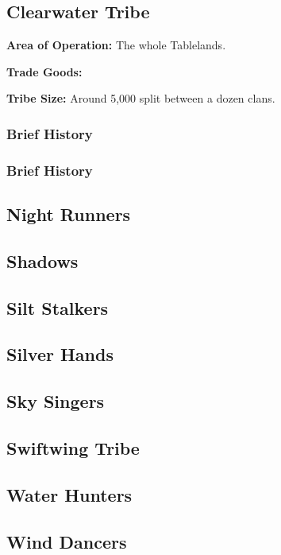 \subsection{Clearwater Tribe}
\textbf{Area of Operation:} The whole Tablelands.

\textbf{Trade Goods:} 

\textbf{Tribe Size:} Around 5,000 split between a dozen clans.

\subsubsection{Brief History}

\subsubsection{Brief History}

\subsection{Night Runners}
\subsection{Shadows}
\subsection{Silt Stalkers}
\subsection{Silver Hands}
\subsection{Sky Singers}
\subsection{Swiftwing Tribe}
\subsection{Water Hunters}
\subsection{Wind Dancers}

